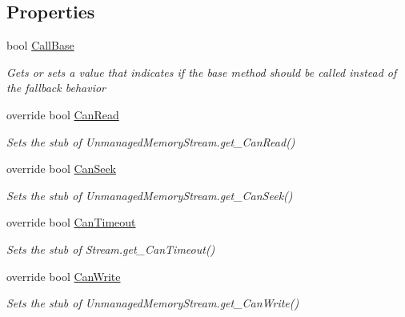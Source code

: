 \subsection*{Properties}
\begin{DoxyCompactItemize}
\item 
bool \hyperlink{class_system_1_1_i_o_1_1_fakes_1_1_stub_unmanaged_memory_stream_a76a58ad918568f2e8b445c059a3e084d}{Call\-Base}
\begin{DoxyCompactList}\small\item\em Gets or sets a value that indicates if the base method should be called instead of the fallback behavior\end{DoxyCompactList}\item 
override bool \hyperlink{class_system_1_1_i_o_1_1_fakes_1_1_stub_unmanaged_memory_stream_af344841ffe32d7f8ca39aa77817e6c2d}{Can\-Read}
\begin{DoxyCompactList}\small\item\em Sets the stub of Unmanaged\-Memory\-Stream.\-get\-\_\-\-Can\-Read()\end{DoxyCompactList}\item 
override bool \hyperlink{class_system_1_1_i_o_1_1_fakes_1_1_stub_unmanaged_memory_stream_a6f47ed351d5c030801c04cf4744167d8}{Can\-Seek}
\begin{DoxyCompactList}\small\item\em Sets the stub of Unmanaged\-Memory\-Stream.\-get\-\_\-\-Can\-Seek()\end{DoxyCompactList}\item 
override bool \hyperlink{class_system_1_1_i_o_1_1_fakes_1_1_stub_unmanaged_memory_stream_a388290cf0869b57edf84a7c77a986313}{Can\-Timeout}
\begin{DoxyCompactList}\small\item\em Sets the stub of Stream.\-get\-\_\-\-Can\-Timeout()\end{DoxyCompactList}\item 
override bool \hyperlink{class_system_1_1_i_o_1_1_fakes_1_1_stub_unmanaged_memory_stream_ad8c60be3bfb804853c99e3aaa388659d}{Can\-Write}
\begin{DoxyCompactList}\small\item\em Sets the stub of Unmanaged\-Memory\-Stream.\-get\-\_\-\-Can\-Write()\end{DoxyCompactList}\item 

\end{DoxyCompactItemize}
